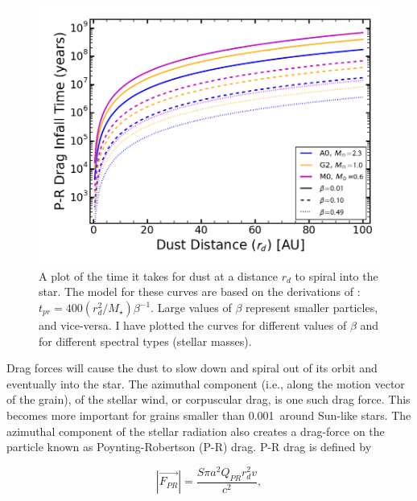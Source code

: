     \begin{figure}
    \centering
    \includegraphics[width=\textwidth]{Ch1/PR_Drag_time} 
    \caption[Poynting-Robertson Drag Timescales]{A plot of the time it takes for dust at a distance $r_d$ to spiral into the star. The model for these curves are based on the derivations of \citet{Burns1979}: $t_{pr}=400(r_d^2/M_\star)\beta^{-1}$. Large values of $\beta$ represent smaller particles, and vice-versa. I have plotted the curves for different values of $\beta$ and for different spectral types (stellar masses).}
    \label{fig:PR_Drag_time}
    \end{figure}
    
    Drag forces will cause the dust to slow down and spiral out of its orbit and eventually into the star. The azimuthal component (i.e., along the motion vector of the grain), of the stellar wind, or corpuscular drag, is one such drag force. This becomes more important for grains smaller than 0.001\micron\ around Sun-like stars\citep{Burns1979}. The azimuthal component of the stellar radiation also creates a drag-force on the particle known as Poynting-Robertson (P-R) drag. P-R drag is defined by
    
    \begin{equation}\label{eq:pr_drag}
    |\vec{F_{PR}}| = \frac{S\pi a^2 Q_{PR}r_d^2 v}{c^2},
    \end{equation}
    
